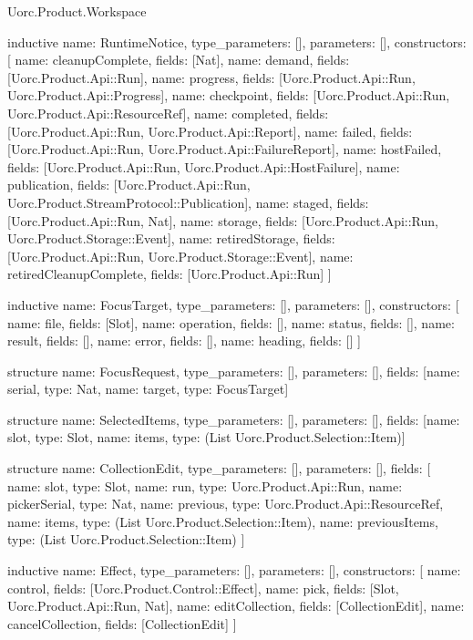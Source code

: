 \begin{lexlean}{Uorc.Product.Workspace}
\begin{semanticmodule}
inductive{
  name: RuntimeNotice,
  type_parameters: [],
  parameters: [],
  constructors: [
    {name: cleanupComplete, fields: [Nat]},
    {name: demand, fields: [Uorc.Product.Api::Run]},
    {name: progress, fields: [Uorc.Product.Api::Run, Uorc.Product.Api::Progress]},
    {name: checkpoint, fields: [Uorc.Product.Api::Run, Uorc.Product.Api::ResourceRef]},
    {name: completed, fields: [Uorc.Product.Api::Run, Uorc.Product.Api::Report]},
    {name: failed, fields: [Uorc.Product.Api::Run, Uorc.Product.Api::FailureReport]},
    {name: hostFailed, fields: [Uorc.Product.Api::Run, Uorc.Product.Api::HostFailure]},
    {name: publication, fields: [Uorc.Product.Api::Run, Uorc.Product.StreamProtocol::Publication]},
    {name: staged, fields: [Uorc.Product.Api::Run, Nat]},
    {name: storage, fields: [Uorc.Product.Api::Run, Uorc.Product.Storage::Event]},
    {name: retiredStorage, fields: [Uorc.Product.Api::Run, Uorc.Product.Storage::Event]},
    {name: retiredCleanupComplete, fields: [Uorc.Product.Api::Run]}
  ]
}

inductive{
  name: FocusTarget,
  type_parameters: [],
  parameters: [],
  constructors: [
    {name: file, fields: [Slot]},
    {name: operation, fields: []},
    {name: status, fields: []},
    {name: result, fields: []},
    {name: error, fields: []},
    {name: heading, fields: []}
  ]
}

structure{
  name: FocusRequest,
  type_parameters: [],
  parameters: [],
  fields: [{name: serial, type: Nat}, {name: target, type: FocusTarget}]
}

structure{
  name: SelectedItems,
  type_parameters: [],
  parameters: [],
  fields: [{name: slot, type: Slot}, {name: items, type: (List Uorc.Product.Selection::Item)}]
}

structure{
  name: CollectionEdit,
  type_parameters: [],
  parameters: [],
  fields: [
    {name: slot, type: Slot},
    {name: run, type: Uorc.Product.Api::Run},
    {name: pickerSerial, type: Nat},
    {name: previous, type: Uorc.Product.Api::ResourceRef},
    {name: items, type: (List Uorc.Product.Selection::Item)},
    {name: previousItems, type: (List Uorc.Product.Selection::Item)}
  ]
}

inductive{
  name: Effect,
  type_parameters: [],
  parameters: [],
  constructors: [
    {name: control, fields: [Uorc.Product.Control::Effect]},
    {name: pick, fields: [Slot, Uorc.Product.Api::Run, Nat]},
    {name: editCollection, fields: [CollectionEdit]},
    {name: cancelCollection, fields: [CollectionEdit]}
  ]
}


\end{semanticmodule}
\end{lexlean}
